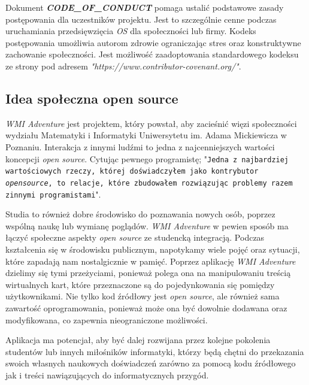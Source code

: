 \documentclass{article}
\begin{document}
\hspace{4mm} Dokument \textbf{\emph{CODE\_OF\_CONDUCT}} pomaga ustalić podstawowe zasady postępowania dla uczestników projektu. Jest to szczególnie cenne podczas uruchamiania przedsięwzięcia \emph{OS} dla społeczności lub firmy. Kodeks postępowania umożliwia autorom zdrowie ograniczając stres oraz konstruktywne zachowanie społeczności\cite{opensource.guide}. Jest możliwość zaadoptowania standardowego kodeksu ze strony pod adresem \emph{"https://www.contributor-covenant.org/"}\cite{contributor.covenant}.

\subsection{Idea społeczna open source}

\hspace{4mm} \emph{WMI Adventure} jest projektem, który powstał, aby zacieśnić więzi społeczności wydziału Matematyki i Informatyki Uniwersytetu im. Adama Mickiewicza w Poznaniu. Interakcja z innymi ludźmi to jedna z najcenniejszych wartości koncepcji \emph{open source}. Cytując pewnego programistę; "\texttt{Jedna z najbardziej wartościowych rzeczy, której doświadczyłem jako kontrybutor \emph{open\newline source}, to relacje, które zbudowałem rozwiązując problemy razem z\newline innymi programistami}"\cite{kentcdodds}. 

Studia to również dobre środowisko do poznawania nowych osób, poprzez wspólną naukę lub wymianę poglądów. \emph{WMI Adventure} w pewien sposób ma łączyć społeczne aspekty \emph{open source} ze studencką integracją. Podczas kształcenia się w środowisku publicznym, napotykamy wiele pojęć oraz sytuacji, które zapadają nam nostalgicznie w pamięć. Poprzez aplikację \emph{WMI Adventure} dzielimy się tymi przeżyciami, ponieważ polega ona na manipulowaniu treścią wirtualnych kart, które przeznaczone są do pojedynkowania się pomiędzy użytkownikami. Nie tylko kod źródłowy jest \emph{open source}, ale również sama zawartość oprogramowania, ponieważ może ona być dowolnie dodawana oraz modyfikowana, co zapewnia nieograniczone możliwości.

Aplikacja ma potencjał, aby być dalej rozwijana przez kolejne pokolenia studentów lub innych miłośników informatyki, którzy będą chętni do przekazania swoich własnych naukowych doświadczeń zarówno za pomocą kodu źródłowego jak i treści nawiązujących do informatycznych przygód.
\end{document}
